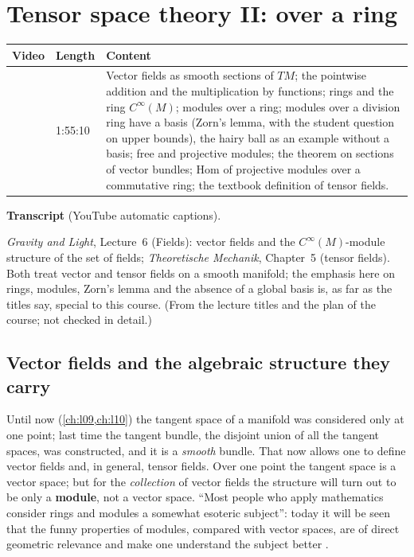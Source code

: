 \chapter{Tensor space theory II: over a ring}\label{ch:l11}
\begin{paracol}{2}

\begin{sources}
\begin{tabularx}{\linewidth}{@{}l l L@{}}
\toprule
\textbf{Video} & \textbf{Length} & \textbf{Content}\\
\midrule
{} & 1:55:10 & Vector fields as smooth sections of $TM$; the pointwise addition and the multiplication by functions; rings and the ring $C^\infty(M)$; modules over a ring; modules over a division ring have a basis (Zorn's lemma, with the student question on upper bounds),
the hairy ball as an example without a basis; free and projective modules; the theorem on sections of vector bundles; $\mathrm{Hom}$ of projective modules over a commutative ring; the textbook definition of tensor fields.\\
\bottomrule
\end{tabularx}

\smallskip
\textbf{Transcript}  (YouTube automatic captions).
\end{sources}

\begin{reading}
\emph{Gravity and Light}, Lecture~6 (Fields): vector fields and the $C^\infty(M)$-module structure of the set of fields; \emph{Theoretische Mechanik}, Chapter~5 (tensor fields). Both treat vector and tensor fields on a smooth manifold; the emphasis here on rings, modules, Zorn's lemma and the absence of a global basis
is, as far as the titles say, special to this course. (From the lecture titles and the plan of the course; not checked in detail.)
\end{reading}

\section{Vector fields and the algebraic structure they carry}\label{sec:rm-fields}

Until now (\cref{ch:l09,ch:l10}) the tangent space of a manifold was considered only at one point; last time the tangent bundle, the disjoint union of all the tangent spaces, was constructed, and it is a \emph{smooth} bundle. That now allows one to define vector fields and, in general, tensor fields. Over one point the tangent space is a vector
space; but for the \emph{collection} of vector fields the structure will turn out to be only a \textbf{module}, not a vector space. ``Most people who apply mathematics consider rings and modules a somewhat esoteric subject'': today it will be seen that the funny properties of modules, compared with vector spaces, are of direct geometric
relevance and make one understand the subject better    .


\end{paracol}
